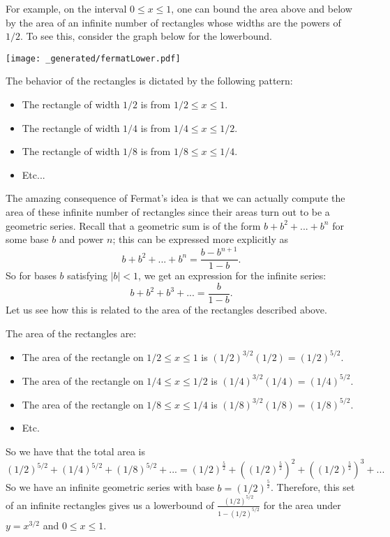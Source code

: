For example, on the interval \(0 \leq x \leq 1\), one can bound the area above and below by the area of an infinite number of rectangles whose widths
are the powers of \(1/2\). To see this, consider the graph below for the lowerbound.

\texttt{[image: \_generated/fermatLower.pdf]}

The behavior of the rectangles is dictated by the following pattern:

\begin{itemize}
\item The rectangle of width \(1/2\) is from \(1/2 \leq x \leq 1\). 
\item The rectangle of width \(1/4\) is from \(1/4 \leq x \leq 1/2\).
\item The rectangle of width \(1/8\) is from \(1/8 \leq x \leq 1/4\). 
\item Etc...
\end{itemize}

The amazing consequence of Fermat's idea is that we can actually compute the area of these infinite number of rectangles since their areas turn out to be a geometric series.
Recall that a geometric sum is of the form \(b + b^2 + ... + b^n\) for some base \(b\) and power \(n\); this can be expressed more explicitly as
\begin{equation}
b + b^2 + ... + b^n = \frac{b - b^{n+1}}{1 - b}.
\end{equation}
So for bases \(b\) satisfying \(|b| < 1\), we get an expression for the infinite series:
\begin{equation}
b + b^2 + b^3 + ... = \frac{b}{1 - b}.
\end{equation}
Let us see how this is related to the area of the rectangles described above.

The area of the rectangles are:
\begin{itemize}
\item The area of the rectangle on \(1/2 \leq x \leq 1\) is \( (1/2)^{3/2} (1/2) = (1/2)^{5/2}\).
\item The area of the rectangle on \(1/4 \leq x \leq 1/2\) is \( (1/4)^{3/2} (1/4) = (1/4)^{5/2}\).
\item The area of the rectangle on \(1/8 \leq x \leq 1/4\) is \( (1/8)^{3/2} (1/8) = (1/8)^{5/2}\).
\item Etc.
\end{itemize}

So we have that the total area is 
\begin{equation}
(1/2)^{5/2} + (1/4)^{5/2} + (1/8)^{5/2} + ... 
    = (1/2)^{\frac{5}{2}} + \left((1/2)^{\frac{5}{2}}\right)^2 + \left((1/2)^{\frac{5}{2}}\right)^3 + ... 
\end{equation}
So we have an infinite geometric series with base \(b = (1/2)^{\frac{5}{2}}\). Therefore, this set of an infinite rectangles gives us a lowerbound
of \(\frac{(1/2)^{5/2}}{1 - (1/2)^{5/2}}\) for the area under \(y = x^{3/2}\) and \(0 \leq x \leq 1\).

